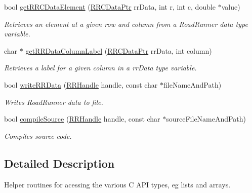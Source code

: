 \begin{DoxyCompactItemize}
bool \hyperlink{group__helper_routines_gaf9a9af778156ea40a6eafe602ba09259}{get\-R\-R\-C\-Data\-Element} (\hyperlink{rrc__types_8h_a9da8b124eb9c3c0045f8926c6a420b4a}{R\-R\-C\-Data\-Ptr} rr\-Data, int r, int c, double $\ast$value)
\begin{DoxyCompactList}\small\item\em Retrieves an element at a given row and column from a Road\-Runner data type variable. \end{DoxyCompactList}\item 
char $\ast$ \hyperlink{group__helper_routines_ga137a6bddea9c76f243efd818b7a1f956}{get\-R\-R\-Data\-Column\-Label} (\hyperlink{rrc__types_8h_a9da8b124eb9c3c0045f8926c6a420b4a}{R\-R\-C\-Data\-Ptr} rr\-Data, int column)
\begin{DoxyCompactList}\small\item\em Retrieves a label for a given column in a rr\-Data type variable. \end{DoxyCompactList}\item 
bool \hyperlink{group__helper_routines_ga9da8d82f97b3e2633ea0c8a7162eb5d2}{write\-R\-R\-Data} (\hyperlink{rrc__types_8h_a1d68f0592372208fa5a5f2799ea4b3ae}{R\-R\-Handle} handle, const char $\ast$file\-Name\-And\-Path)
\begin{DoxyCompactList}\small\item\em Writes Road\-Runner data to file. \end{DoxyCompactList}\item 
bool \hyperlink{group__helper_routines_gae8189a0b11a0263d9232347bf7881776}{compile\-Source} (\hyperlink{rrc__types_8h_a1d68f0592372208fa5a5f2799ea4b3ae}{R\-R\-Handle} handle, const char $\ast$source\-File\-Name\-And\-Path)
\begin{DoxyCompactList}\small\item\em Compiles source code. \end{DoxyCompactList}\end{DoxyCompactItemize}


\subsection{Detailed Description}
Helper routines for acessing the various C A\-P\-I types, eg lists and arrays. 

